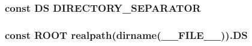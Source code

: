 \subsubsection[{D\+S}]{\setlength{\rightskip}{0pt plus 5cm}const D\+S D\+I\+R\+E\+C\+T\+O\+R\+Y\+\_\+\+S\+E\+P\+A\+R\+A\+T\+O\+R}\label{constants_8php_ae073998f73900b8375397889044c8313}
\hypertarget{constants_8php_a18c0644836e196aed6d63779e14d6bd8}{}
\subsubsection[{R\+O\+O\+T}]{\setlength{\rightskip}{0pt plus 5cm}const R\+O\+O\+T realpath(dirname(\+\_\+\+\_\+\+F\+I\+L\+E\+\_\+\+\_\+)).{\bf D\+S}}\label{constants_8php_a18c0644836e196aed6d63779e14d6bd8}
